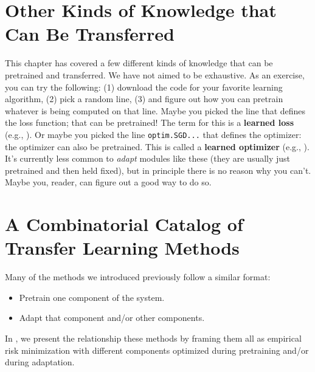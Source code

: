 


\section{Other Kinds of Knowledge that Can Be Transferred}

This chapter has covered a few different kinds of knowledge that can be pretrained and transferred. We have not aimed to be exhaustive. As an exercise, you can try the following: (1) download the code for your favorite learning algorithm, (2) pick a random line, (3) and figure out how you can pretrain whatever is being computed on that line. Maybe you picked the line that defines the loss function; that can be pretrained! The term for this is a \textbf{learned loss} (e.g., \cite{houthooft2018evolved}). Or maybe you picked the line \texttt{optim.SGD...} that defines the optimizer: the optimizer can also be pretrained. This is called a \textbf{learned optimizer} (e.g., \cite{andrychowicz2016learning}). It's currently less common to \textit{adapt} modules like these (they are usually just pretrained and then held fixed), but in principle there is no reason why you can't. Maybe you, reader, can figure out a good way to do so.


\section{A Combinatorial Catalog of Transfer Learning Methods}\label{sec:transfer_learning:combinatorial_catalog}

Many of the methods we introduced previously follow a similar format:
\begin{itemize}
    \item Pretrain one component of the system.
    \item Adapt that component and/or other components.
\end{itemize}

In \tab{\ref{tab:generative_models:types_of_gen_model}}, we present the relationship these methods by framing them all as empirical risk minimization with different components optimized during pretraining and/or during adaptation.


